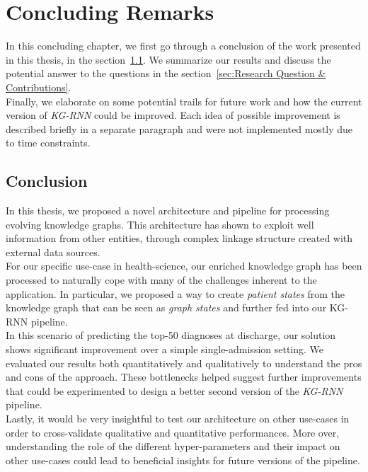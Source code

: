 \chapter{Concluding Remarks}
\label{chap:Concluding Remarks}
In this concluding chapter, we first go through a conclusion of the work presented in this thesis, in the section~\ref{sec:Conclusion}. We summarize our results and discuss the potential answer to the questions in the section~\ref{sec:Research Question & Contributions}. \\

Finally, we elaborate on some potential trails for future work and how the current version of \emph{KG-RNN} could be improved. Each idea of possible improvement is described briefly in a separate paragraph and were not implemented mostly due to time constraints.

\section{Conclusion}
\label{sec:Conclusion}
In this thesis, we proposed a novel architecture and pipeline for processing evolving knowledge graphs. This architecture has shown to exploit well information from other entities, through complex linkage structure created with external data sources. \\

For our specific use-case in health-science, our enriched knowledge graph has been processed to naturally cope with many of the challenges inherent to the application. In particular, we proposed a way to create \textit{patient states} from the knowledge graph that can be seen as \textit{graph states} and further fed into our KG-RNN pipeline. \\

In this scenario of predicting the top-50 diagnoses at discharge, our solution shows significant improvement over a simple single-admission setting. We evaluated our results both quantitatively and qualitatively to understand the pros and cons of the approach. These bottlenecks helped suggest further improvements that could be experimented to design a better second version of the \emph{KG-RNN} pipeline. \\

Lastly, it would be very insightful to test our architecture on other use-cases in order to cross-validate qualitative and quantitative performances. More over, understanding the role of the different hyper-parameters and their impact on other use-cases could lead to beneficial insights for future versions of the pipeline.

